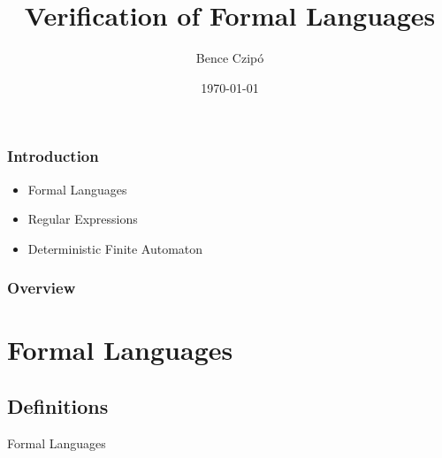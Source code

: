 \documentclass{beamer}
\title[Semester project]{Verification of Formal Languages} %
\author{Bence Czipó} %
\institute[] %
{
École Polytechnique Fédérale de Lausanne \\ %
\medskip
\textit{bence.czipo@epfl.ch} %
}
\date{\today} %
\begin{document}
\begin{frame}
\titlepage %
\end{frame}


\begin{frame}
\frametitle{Introduction}

\begin{itemize}
	\item Formal Languages
	\item Regular Expressions
	\item Deterministic Finite Automaton
\end{itemize}

\end{frame}

\begin{frame}
\frametitle{Overview} %
\tableofcontents %
\end{frame}


\section{Formal Languages}
\subsection{Definitions}

\begin{frame}
	\Huge{\centerline{Formal Languages}}
\end{frame}
\end{document}
